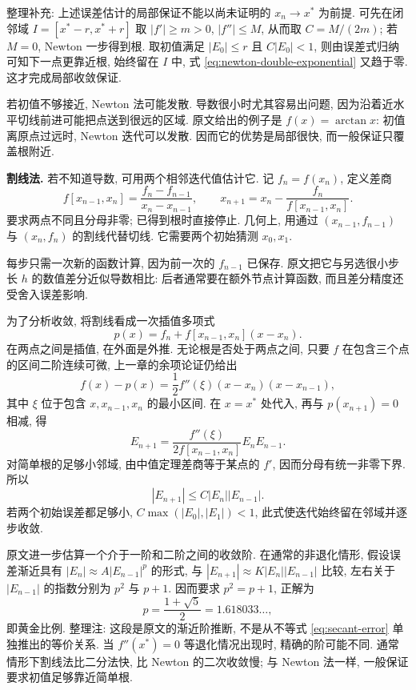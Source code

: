 \begin{remark}
整理补充: 上述误差估计的局部保证不能以尚未证明的 $x_n\to x^*$ 为前提. 可先在闭邻域 $I=[x^*-r,x^*+r]$ 取 $|f'|\geq m>0$, $|f''|\leq M$, 从而取 $C=M/(2m)$; 若 $M=0$, Newton 一步得到根. 取初值满足 $|E_0|\leq r$ 且 $C|E_0|<1$, 则由误差式归纳可知下一点更靠近根, 始终留在 $I$ 中, 式 \eqref{eq:newton-double-exponential} 又趋于零. 这才完成局部收敛保证.
\end{remark}

若初值不够接近, Newton 法可能发散. 导数很小时尤其容易出问题, 因为沿着近水平切线前进可能把点送到很远的区域. 原文给出的例子是 $f(x)=\arctan x$: 初值离原点过远时, Newton 迭代可以发散. 因而它的优势是局部很快, 而一般保证只覆盖根附近.

\textbf{割线法.} 若不知道导数, 可用两个相邻迭代值估计它. 记 $f_n=f(x_n)$, 定义差商
\[
f[x_{n-1},x_n]=\frac{f_n-f_{n-1}}{x_n-x_{n-1}},\qquad
x_{n+1}=x_n-\frac{f_n}{f[x_{n-1},x_n]}.
\]
要求两点不同且分母非零; 已得到根时直接停止. 几何上, 用通过 $(x_{n-1},f_{n-1})$ 与 $(x_n,f_n)$ 的割线代替切线. 它需要两个初始猜测 $x_0,x_1$.

每步只需一次新的函数计算, 因为前一次的 $f_{n-1}$ 已保存. 原文把它与另选很小步长 $h$ 的数值差分近似导数相比: 后者通常要在额外节点计算函数, 而且差分精度还受舍入误差影响.

为了分析收敛, 将割线看成一次插值多项式
\[
p(x)=f_n+f[x_{n-1},x_n](x-x_n).
\]
在两点之间是插值, 在外面是外推. 无论根是否处于两点之间, 只要 $f$ 在包含三个点的区间二阶连续可微, 上一章的余项论证仍给出
\[
f(x)-p(x)=\frac12f''(\xi)(x-x_n)(x-x_{n-1}),
\]
其中 $\xi$ 位于包含 $x,x_{n-1},x_n$ 的最小区间. 在 $x=x^*$ 处代入, 再与 $p(x_{n+1})=0$ 相减, 得
\[
E_{n+1}=\frac{f''(\xi)}{2f[x_{n-1},x_n]}E_nE_{n-1}.
\]
对简单根的足够小邻域, 由中值定理差商等于某点的 $f'$, 因而分母有统一非零下界. 所以
\begin{equation}\label{eq:secant-error}
|E_{n+1}|\leq C|E_n||E_{n-1}|.
\end{equation}
若两个初始误差都足够小, $C\max(|E_0|,|E_1|)<1$, 此式使迭代始终留在邻域并逐步收敛.

原文进一步估算一个介于一阶和二阶之间的收敛阶. 在通常的非退化情形, 假设误差渐近具有 $|E_n|\approx A|E_{n-1}|^p$ 的形式, 与 $|E_{n+1}|\approx K|E_n||E_{n-1}|$ 比较, 左右关于 $|E_{n-1}|$ 的指数分别为 $p^2$ 与 $p+1$. 因而要求 $p^2=p+1$, 正解为
\[
p=\frac{1+\sqrt5}{2}=1.618033\ldots,
\]
即黄金比例. 整理注: 这段是原文的渐近阶推断, 不是从不等式 \eqref{eq:secant-error} 单独推出的等价关系. 当 $f''(x^*)=0$ 等退化情况出现时, 精确的阶可能不同. 通常情形下割线法比二分法快, 比 Newton 的二次收敛慢; 与 Newton 法一样, 一般保证要求初值足够靠近简单根.

